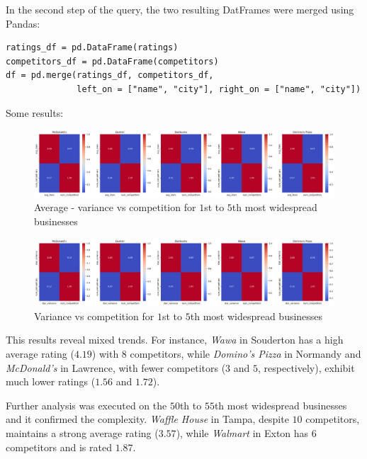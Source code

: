 \documentclass{Configuration_Files/PoliMi3i_thesis}
\begin{document}
In the second step of the query, the two resulting DatFrames were merged using Pandas:
\bigskip 

\begin{verbatim}
ratings_df = pd.DataFrame(ratings)
competitors_df = pd.DataFrame(competitors)
df = pd.merge(ratings_df, competitors_df, 
              left_on = ["name", "city"], right_on = ["name", "city"])
\end{verbatim}

\bigskip

Some results:
\bigskip

\begin{figure}[H]
    \centering
    \includegraphics[width=\columnwidth]{imgs/query_4b.png}
    \caption{Average - variance vs competition for $1$st to $5$th most widespread businesses}
    \label{fig:query_4b}
\end{figure}

\bigskip

\begin{figure}[H]
    \centering
    \includegraphics[width=\columnwidth]{imgs/query_4e.png}
    \caption{Variance vs competition for $1$st to $5$th most widespread businesses}
    \label{fig:query_4e}
\end{figure}

\bigskip

This results reveal mixed trends. For instance, \textit{Wawa} in Souderton has a high average rating ($4.19$) with $8$ competitors, while \textit{Domino's Pizza} in Normandy and \textit{McDonald's} in Lawrence, with fewer competitors ($3$ and $5$, respectively), exhibit much lower ratings ($1.56$ and $1.72$). 

Further analysis was executed on the $50$th to $55$th most widespread businesses and it confirmed the complexity. \textit{Waffle House} in Tampa, despite $10$ competitors, maintains a strong average rating ($3.57$), while \textit{Walmart} in Exton has $6$ competitors and is rated $1.87$. 
\end{document}
